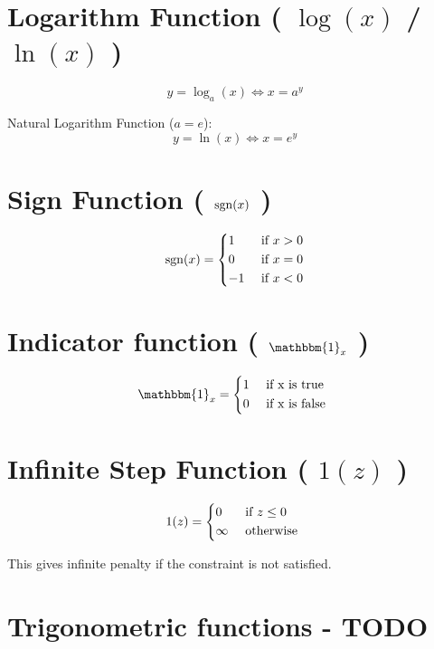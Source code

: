 \section{Logarithm Function ( $\log(x)$ / $\ln(x)$ )}\label{Logarithm Function}
\[
    y = \log_a(x) \Leftrightarrow x = a^y
\]

Natural Logarithm Function ($a=e$):
\[
    y = \ln(x) \Leftrightarrow x = e^y
\]


\section{Sign Function ( $\operatorname{sgn}(x)$ )}\label{Sign Function}
\[
    \operatorname{sgn}(x) = \begin{dcases}
         1 & \text{ if } x > 0 \\
         0 & \text{ if } x = 0 \\
         -1 & \text{ if } x < 0 
    \end{dcases}
\]



\section{Indicator function ( $\mathbbm{1}_x$ )}\label{Indicator function}

\[
    \mathbbm{1}_x = {\begin{dcases}
        1 & \text{ if x is true } \\
        0 & \text{ if x is false }
    \end{dcases}}
\]

\section{Infinite Step Function ( $1(z)$ )}

\[
    1(z) = {\begin{dcases}
        0 & \text{ if } z \leq 0 \\
        \infty & \text{ otherwise }
    \end{dcases}}
\]

This gives infinite penalty if the constraint is not satisfied.


\section{Trigonometric functions - TODO \cite{wiki-Trigonometric_functions}}\label{Trigonometric functions}

